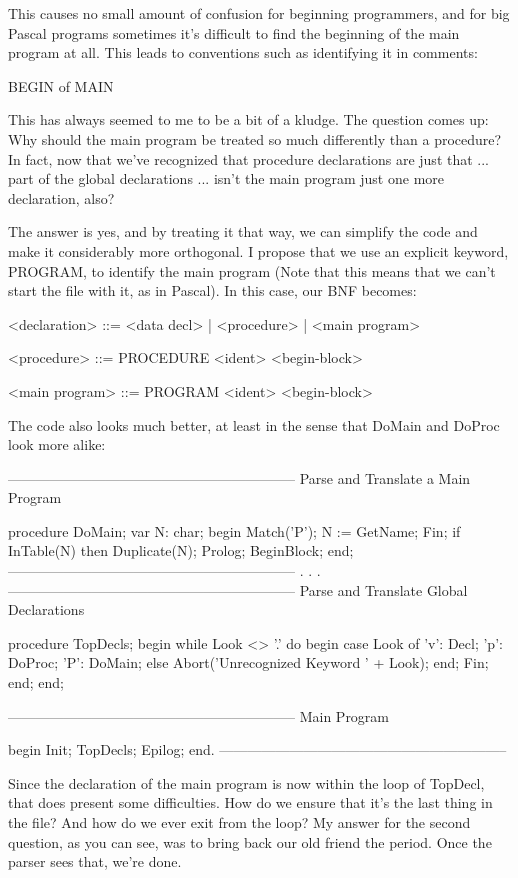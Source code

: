 \documentclass[float=false, crop=false]{standalone}
\begin{document}
This causes no small amount of confusion for beginning programmers, and for big
Pascal programs sometimes it's difficult to find the beginning of the main
program at all. This leads to conventions such as identifying it in comments:


     BEGIN { of MAIN }


This has always seemed to me to be a bit of a kludge. The question comes up: Why
should the main program be treated so much differently than a procedure? In
fact, now that we've recognized that procedure declarations are just that ...
part of the global declarations ... isn't the main program just one more
declaration, also?

The answer is yes, and by treating it that way, we can simplify the code and
make it considerably more orthogonal. I propose that we use an explicit keyword,
PROGRAM, to identify the main program (Note that this means that we can't start
the file with it, as in Pascal). In this case, our BNF becomes:


     <declaration> ::= <data decl> | <procedure> | <main program>


     <procedure> ::= PROCEDURE <ident> <begin-block>


     <main program> ::= PROGRAM <ident> <begin-block>


The code also looks much better, at least in the sense that DoMain and DoProc
look more alike:


{--------------------------------------------------------------}
{ Parse and Translate a Main Program }

procedure DoMain;
var N: char;
begin
     Match('P');
     N := GetName;
     Fin;
     if InTable(N) then Duplicate(N);
     Prolog;
     BeginBlock;
end;
{--------------------------------------------------------------}
.
.
.
{--------------------------------------------------------------}
{ Parse and Translate Global Declarations }

procedure TopDecls;
begin
     while Look <> '.' do begin
      case Look of
            'v': Decl;
            'p': DoProc;
            'P': DoMain;
          else Abort('Unrecognized Keyword ' + Look);
          end;
          Fin;
     end;
end;


{--------------------------------------------------------------}
{ Main Program }

begin
     Init;
     TopDecls;
     Epilog;
end.
{--------------------------------------------------------------}


Since the declaration of the main program is now within the loop of TopDecl,
that does present some difficulties. How do we ensure that it's the last thing
in the file? And how do we ever exit from the loop? My answer for the second
question, as you can see, was to bring back our old friend the period. Once the
parser sees that, we're done.
\end{document}
